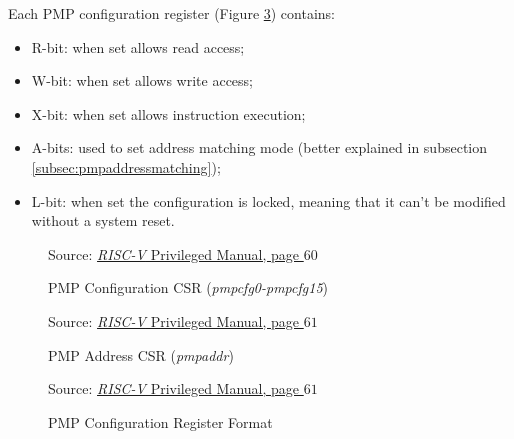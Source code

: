 Each PMP configuration register (Figure \ref{fig:pmpconf}) contains:
\begin{itemize}
  \item R-bit: when set allows read access;

  \item W-bit: when set allows write access;

  \item X-bit: when set allows instruction execution;

  \item A-bits: used to set address matching mode (better explained in subsection
    \ref{subsec:pmpaddressmatching});

  \item L-bit: when set the configuration is locked, meaning that it can't be modified
    without a system reset.
\end{itemize}

\begin{figure}[H]
  \centering
  \def\stackalignment{r}
  {\scriptsize Source: \href{https://drive.google.com/file/d/17GeetSnT5wW3xNuAHI95-SI1gPGd5sJ_/view}{\textit{RISC-V} Privileged Manual, page $60$}}
  \caption{PMP Configuration CSR (\textit{pmpcfg0-pmpcfg15})}
  \label{fig:pmpcfgs}
\end{figure}

\begin{figure}[H]
  \centering
  \def\stackalignment{r} %
  {\scriptsize Source: \href{https://drive.google.com/file/d/17GeetSnT5wW3xNuAHI95-SI1gPGd5sJ_/view}{\textit{RISC-V} Privileged Manual, page $61$}}
  \caption{PMP Address CSR (\textit{pmpaddr})}
  \label{fig:pmpaddr}
\end{figure}

\begin{figure}[H]
  \centering
  \def\stackalignment{r} %
  {\scriptsize Source: \href{https://drive.google.com/file/d/17GeetSnT5wW3xNuAHI95-SI1gPGd5sJ_/view}{\textit{RISC-V} Privileged Manual, page $61$}}
  \caption{PMP Configuration Register Format}
  \label{fig:pmpconf}
\end{figure}

